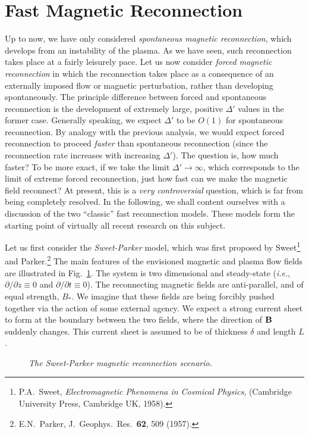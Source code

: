 \section{Fast Magnetic Reconnection}
Up to now, we have only considered {\em spontaneous magnetic reconnection}, which
develops from an instability of the plasma. As we have seen, such reconnection
takes place at a fairly leisurely pace. Let us now consider {\em forced
magnetic reconnection}\/ in which the reconnection takes place as a consequence
of an externally imposed flow or magnetic perturbation, rather than
developing spontaneously. The principle difference between forced
and spontaneous reconnection is the development of extremely large, positive
${\Delta}'$ values in the former case. Generally speaking, we expect ${\Delta}'$
to be $O(1)$ for spontaneous reconnection.  By analogy with the previous
analysis, we would expect forced reconnection to proceed {\em faster} than
spontaneous reconnection (since the reconnection rate increases with
increasing ${\Delta}'$). The question is, how much faster? To be more
exact, if we take the limit ${\Delta}'\rightarrow \infty$, which
corresponds to the limit of extreme forced reconnection, just  how fast can we
make the magnetic field reconnect? At present, this is a {\em very controversial}
question, which is far from being completely
resolved. In the following, we shall content
ourselves with a discussion of  the two ``classic''  fast reconnection
models. These models form the starting point of virtually all recent research on this
subject.

Let us first consider the {\em Sweet-Parker} model, which was first proposed
 by Sweet\footnote{P.A.~Sweet, {\em Electromagnetic Phenomena in Cosmical Physics},
(Cambridge University Press, Cambridge UK, 1958).} and
 Parker.\footnote{E.N.~Parker, J.~Geophys.\ Res.\ {\bf 62}, 509 (1957).} The
main features of the envisioned magnetic and plasma flow
fields  are illustrated in Fig.~\ref{f28}. The system is two
dimensional and steady-state ({\em i.e.}, $\partial/\partial z\equiv 0$ and
$\partial/\partial t\equiv 0$). The reconnecting magnetic fields are anti-parallel,
and of equal strength, $B_\ast$. We imagine that these fields are 
being forcibly
pushed together via the action of some external agency. 
We expect a strong current sheet to form at the boundary between the
two fields, where the direction of ${\bf B}$ suddenly changes.
This current sheet is assumed to be of thickness
$\delta$ and length $L$. 

\begin{figure}
\epsfysize=2.5in
\centerline{}
\caption{\em The Sweet-Parker magnetic reconnection scenario.}\label{f28}
\end{figure}

